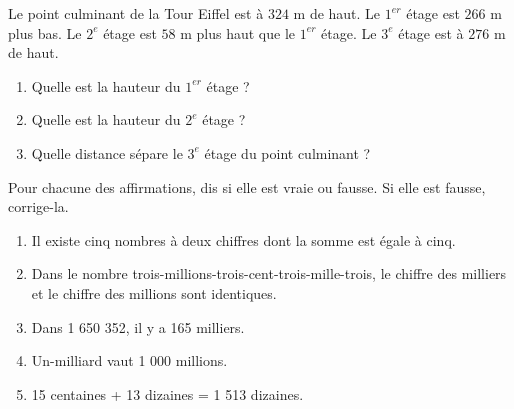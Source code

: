 \documentclass[a4paper,10pt]{report}
\begin{document}
\begin{ex}
Le point culminant de la Tour Eiffel est à $324$ m de haut. Le $1^{er}$ étage est $266$ m plus bas. Le $2^e$ étage est $58$ m plus haut que le $1^{er}$ étage. Le $3^e$ étage est à $276$ m de haut.
\begin{enumerate}
\item Quelle est la hauteur du $1^{er}$ étage ?
\item Quelle est la hauteur du $2^e$ étage ?
\item Quelle distance sépare le $3^e$ étage du point culminant ?
\end{enumerate}
\end{ex}

\begin{ex}
Pour chacune des affirmations, dis si elle est vraie ou fausse. Si elle est fausse, corrige-la.
\begin{enumerate}
\item Il existe cinq nombres à deux chiffres dont la somme est égale à cinq.
\item Dans le nombre trois-millions-trois-cent-trois-mille-trois, le chiffre des milliers et le chiffre des millions sont identiques.
\item Dans 1 650 352, il y a 165 milliers.
\item Un-milliard vaut 1 000 millions.
\item 15 centaines + 13 dizaines = 1 513 dizaines.
\end{enumerate}
\end{ex}
\end{document}
